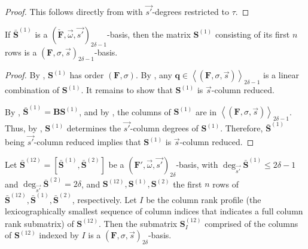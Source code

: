 \begin{proof}
This follows directly from  with $\vec{s'}$-degrees
restricted to $\tau$.\end{proof}
\begin{lem}
\label{lem:2delta-1Basis}If $\bar{\mathbf{S}}^{\left(1\right)}$
is a $(\check{\mathbf{F}},\vec{\omega},\vec{s'})_{2\delta-1}$-basis,
then the matrix $\mathbf{S}^{\left(1\right)}$ consisting of its first
$n$ rows is a $\left(\mathbf{F},\sigma,\vec{s}\right)_{2\delta-1}$-basis.\end{lem}
\begin{proof}
By , $\mathbf{S}^{\left(1\right)}$ has
order $\left(\mathbf{F},\sigma\right)$. By ,
any $\mathbf{q}\in\left\langle \left(\mathbf{F},\sigma,\vec{s}\right)\right\rangle _{2\delta-1}$
is a linear combination of $\mathbf{S}^{\left(1\right)}$. It remains
to show that $\mathbf{S}^{\left(1\right)}$ is $\vec{s}$-column reduced.

By , $\bar{\mathbf{S}}^{\left(1\right)}=\mathbf{B}\mathbf{S}^{\left(1\right)}$,
and by , the columns of $\mathbf{S}^{\left(1\right)}$
are in $\left\langle \left(\mathbf{F},\sigma,\vec{s}\right)\right\rangle _{2\delta-1}$.
Thus, by , $\mathbf{S}^{\left(1\right)}$
determines the $\vec{s'}$-column degrees of $\mathbf{S}^{\left(1\right)}$.
Therefore, $\bar{\mathbf{S}}^{\left(1\right)}$ being $\vec{s'}$-column
reduced implies that $\mathbf{S}^{\left(1\right)}$ is $\vec{s}$-column
reduced.\end{proof}
\begin{lem}
\label{lem:2deltaBasis} Let $\bar{\mathbf{S}}^{\left(12\right)}=[\bar{\mathbf{S}}^{\left(1\right)},\bar{\mathbf{S}}^{\left(2\right)}]$
be a $(\mathbf{F}',\vec{\omega},\vec{s'})_{2\delta}$-basis, with
$\deg_{\vec{s'}}\bar{\mathbf{S}}^{\left(1\right)}\le2\delta-1$ and
$\deg_{\vec{s'}}\bar{\mathbf{S}}^{\left(2\right)}=2\delta$, and $\mathbf{S}^{\left(12\right)},\mathbf{S}^{\left(1\right)},\mathbf{S}^{\left(2\right)}$
the first $n$ rows of $\bar{\mathbf{S}}^{\left(12\right)},\bar{\mathbf{S}}^{\left(1\right)},\bar{\mathbf{S}}^{\left(2\right)}$,
respectively. Let $I$ be the column rank profile (the lexicographically
smallest sequence of column indices that indicates a full column rank
submatrix) of $\mathbf{S}^{\left(12\right)}$. %
Then the submatrix\textbf{ $\mathbf{S}_{I}^{\left(12\right)}$ }comprised
of the columns of $\mathbf{S}^{\left(12\right)}$ indexed by $I$
is a $\left(\mathbf{F},\sigma,\vec{s}\right)_{2\delta}$-basis. \end{lem}
